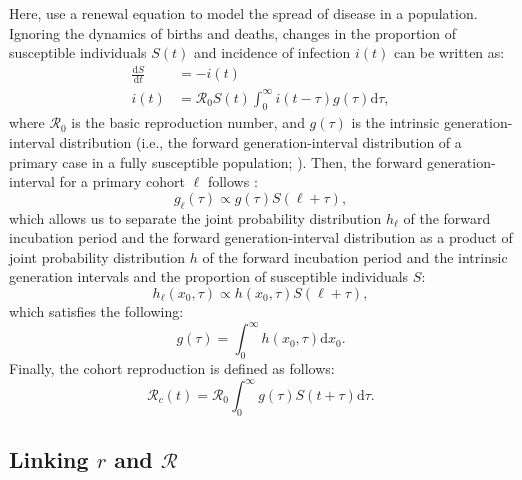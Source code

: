 \documentclass[12pt]{article}
\begin{document}
Here, use a renewal equation to model the spread of disease in a population.
Ignoring the dynamics of births and deaths, changes in the proportion of susceptible individuals $S(t)$ and incidence of infection $i(t)$ can be written as:
\begin{equation}
\begin{aligned}
\frac{\mathrm{d}S}{\mathrm{d}t} &= - i(t)\\
i(t) &= \mathcal R_0 S(t) \int_0^\infty i(t-\tau) g(\tau) \mathrm{d}\tau,
\end{aligned}
\label{eq:renewal}
\end{equation}
where $\mathcal R_0$ is the basic reproduction number, and $g(\tau)$ is the intrinsic generation-interval distribution (i.e., the forward generation-interval distribution of a primary case in a fully susceptible population; \cite{champredon2015intrinsic}).
Then, the forward generation-interval for a primary cohort $\ell$ follows \citep{champredon2015intrinsic}:
\begin{equation}
g_\ell (\tau) \propto g(\tau) S(\ell + \tau),
\end{equation}
which allows us to separate the joint probability distribution $h_\ell$ of the forward incubation period and the forward generation-interval distribution as a product of joint probability distribution $h$ of the forward incubation period and the intrinsic generation intervals and the proportion of susceptible individuals $S$:
\begin{equation}
h_\ell (x_0, \tau) \propto h(x_0, \tau) S(\ell + \tau),
\end{equation}
which satisfies the following:
\begin{equation}
g(\tau) = \int_0^\infty h(x_0, \tau) \mathrm{d}x_0.
\end{equation}
Finally, the cohort reproduction is defined as follows:
\begin{equation}
\mathcal R_c(t) = \mathcal R_0 \int_0^\infty g(\tau) S(t+\tau) \mathrm{d} \tau.
\end{equation}

\subsection{Linking $r$ and $\mathcal R$}
\end{document}
